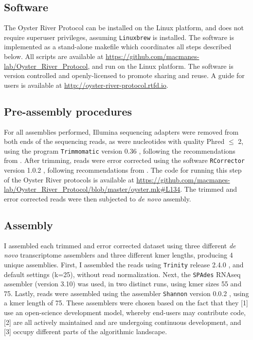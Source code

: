 \documentclass[10pt,letterpaper]{article}
\begin{document}
\subsection{Software}

The Oyster River Protocol can be installed on the Linux platform, and does not require superuser privileges, assuming \texttt{Linuxbrew} \citep{Jackman:2016bx} is installed. The software is implemented as a stand-alone makefile which coordinates all steps described below. All scripts are available at \url{https://github.com/macmanes-lab/Oyster_River_Protocol}, and run on the Linux platform. The software is version controlled and openly-licensed to promote sharing and reuse. A guide for users is available at \url{http://oyster-river-protocol.rtfd.io}. 


\subsection{Pre-assembly procedures}

For all assemblies performed, Illumina sequencing adapters were removed from both ends of the sequencing reads, as were nucleotides with quality Phred $\leq$ 2, using the program \texttt{Trimmomatic} version 0.36 \cite{Bolger:2014ek}, following the recommendations from \cite{MacManes:2014io}. After trimming, reads were error corrected using the software \texttt{RCorrector} version 1.0.2 \cite{Song:2015in}, following recommendations from \cite{MacManes:2013ec}. The code for running this step of the Oyster River protocols is available at \url{https://github.com/macmanes-lab/Oyster_River_Protocol/blob/master/oyster.mk#L134}. The trimmed and error corrected reads were then subjected to \textit{de novo} assembly. 


\subsection{Assembly}

I assembled each trimmed and error corrected dataset using three different \textit{de novo} transcriptome assemblers and three different kmer lengths, producing 4 unique assemblies. First, I assembled the reads using \texttt{Trinity} release 2.4.0 \citep{Haas:2013jq}, and default settings (k=25), without read normalization. Next, the \texttt{SPAdes} RNAseq assembler (version 3.10) \cite{Chikhi:2013ep} was used, in two distinct runs, using kmer sizes 55 and 75. Lastly, reads were assembled using the assembler \texttt{Shannon} version 0.0.2 \cite{Kannan:2016be}, using a kmer length of 75. These assemblers were chosen based on the fact that they [1] use an open-science development model, whereby end-users may contribute code, [2] are all actively maintained and are undergoing continuous development, and [3] occupy different parts of the algorithmic landscape. 
\end{document}
